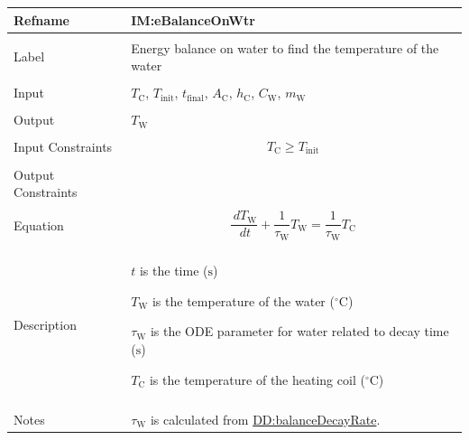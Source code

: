 \documentclass[12pt]{article}
\begin{document}
\vspace{\baselineskip}
\noindent
\begin{minipage}{\textwidth}
\begin{tabular}{>{\raggedright}p{}>{\raggedright\arraybackslash}p{}}
\toprule \textbf{Refname} & \textbf{IM:eBalanceOnWtr}
\label{IM:eBalanceOnWtr}
\\ \midrule \\
Label & Energy balance on water to find the temperature of the water
        
\\ \midrule \\
Input & ${T_{\text{C}}}$, ${T_{\text{init}}}$, ${t_{\text{final}}}$, ${A_{\text{C}}}$, ${h_{\text{C}}}$, ${C_{\text{W}}}$, ${m_{\text{W}}}$
        
\\ \midrule \\
Output & ${T_{\text{W}}}$
         
\\ \midrule \\
Input Constraints & \begin{displaymath}
                    {T_{\text{C}}}\geq{}{T_{\text{init}}}
                    \end{displaymath}
\\ \midrule \\
Output Constraints & 
\\ \midrule \\
Equation & \begin{displaymath}
           \frac{\,d{T_{\text{W}}}}{\,dt}+\frac{1}{{τ_{\text{W}}}} {{T_{\text{W}}}}=\frac{1}{{τ_{\text{W}}}} {T_{\text{C}}}
           \end{displaymath}
\\ \midrule \\
Description & \begin{symbDescription}
              \item{$t$ is the time (${\text{s}}$)}
              \item{${T_{\text{W}}}$ is the temperature of the water (${{}^{\circ}\text{C}}$)}
              \item{${τ_{\text{W}}}$ is the ODE parameter for water related to decay time (${\text{s}}$)}
              \item{${T_{\text{C}}}$ is the temperature of the heating coil (${{}^{\circ}\text{C}}$)}
              \end{symbDescription}
\\ \midrule \\
Notes & ${τ_{\text{W}}}$ is calculated from \hyperref[DD:balanceDecayRate]{DD:balanceDecayRate}.
        

\end{tabular}
\end{minipage}
\end{document}
